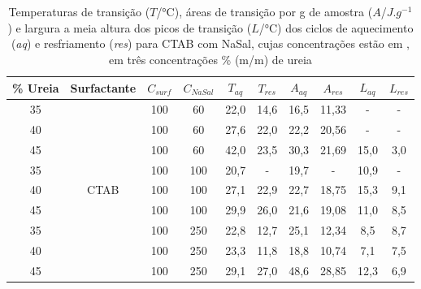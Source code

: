     \begin{table}[H]
      \IBGEtab%
      {\caption{Temperaturas de transição ($T$/°C), áreas de transição por g de amostra ($A$/$J.g^{-1}$) e largura a meia altura dos picos de transição ($L$/°C) dos ciclos de aquecimento (\emph{aq}) e resfriamento (\emph{res}) para CTAB com NaSal, cujas concentrações estão em \mM, em três concentrações \% (m/m) de ureia}
      \label{tab:DSC_temp_areas_NaSal}}%
        {\begin{tabular}{cccccccccc}
        	\toprule
        	\% Ureia &      Surfactante      & $C_{surf}$ & $C_{NaSal}$ & $T_{aq}$ & $T_{res}$ & $A_{aq}$ & $A_{res}$ & $L_{aq}$ & $L_{res}$ \\ \midrule
        	   35    & \multirow{9}{*}{CTAB} &    100     &     60      &   22,0   &   14,6    &   16,5   &   11,33   &    -     &     -     \\
        	   40    &                       &    100     &     60      &   27,6   &   22,0    &   22,2   &   20,56   &    -     &     -     \\
        	   45    &                       &    100     &     60      &   42,0   &   23,5    &   30,3   &   21,69   &   15,0   &    3,0    \\
        	   35    &                       &    100     &     100     &   20,7   &     -     &   19,7   &     -     &   10,9   &     -     \\
        	   40    &                       &    100     &     100     &   27,1   &   22,9    &   22,7   &   18,75   &   15,3   &    9,1    \\
        	   45    &                       &    100     &     100     &   29,9   &   26,0    &   21,6   &   19,08   &   11,0   &    8,5    \\
        	   35    &                       &    100     &     250     &   22,8   &   12,7    &   25,1   &   12,34   &   8,5    &    8,7    \\
        	   40    &                       &    100     &     250     &   23,3   &   11,8    &   18,8   &   10,74   &   7,1    &    7,5    \\
        	   45    &                       &    100     &     250     &   29,1   &   27,0    &   48,6   &   28,85   &   12,3   &    6,9    \\ \bottomrule
        \end{tabular}}%
            {}
    \end{table}

